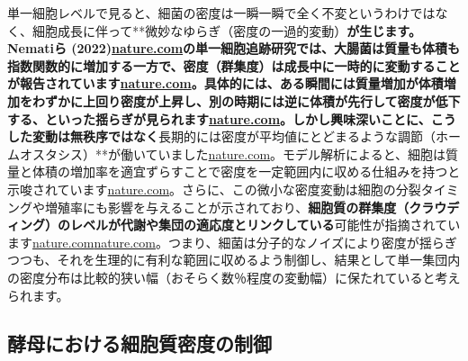 単一細胞レベルで見ると、細菌の密度は一瞬一瞬で全く不変というわけではなく、細胞成長に伴って**微妙なゆらぎ（密度の一過的変動）\textbf{が生じます。Nematiら (2022)\href{https://www.nature.com/articles/s42003-022-03348-2\#:~:text=Single,link\%20between\%20the\%20levels\%20of}{nature.com}の単一細胞追跡研究では、\textbf{大腸菌は質量も体積も指数関数的に増加する一方で、密度（群集度）は成長中に一時的に変動する}ことが報告されています\href{https://www.nature.com/articles/s42003-022-03348-2\#:~:text=Single,link\%20between\%20the\%20levels\%20of}{nature.com}。具体的には、ある瞬間には質量増加が体積増加をわずかに上回り密度が上昇し、別の時期には逆に体積が先行して密度が低下する、といった揺らぎが見られます\href{https://www.nature.com/articles/s42003-022-03348-2\#:~:text=Single,link\%20between\%20the\%20levels\%20of}{nature.com}。しかし興味深いことに、こうした変動は無秩序ではなく}長期的には密度が平均値にとどまるような調節（ホームオスタシス）**が働いていました\href{https://www.nature.com/articles/s42003-022-03348-2\#:~:text=fluctuate\%20during\%20growth,the\%20\%E2\%80\%9Cinvisible\%E2\%80\%9D\%20microfluidic\%20arrays\%20that}{nature.com}。モデル解析によると、細胞は質量と体積の増加率を適宜ずらすことで密度を一定範囲内に収める仕組みを持つと示唆されています\href{https://www.nature.com/articles/s42003-022-03348-2\#:~:text=fluctuate\%20during\%20growth,the\%20\%E2\%80\%9Cinvisible\%E2\%80\%9D\%20microfluidic\%20arrays\%20that}{nature.com}。さらに、この微小な密度変動は細胞の分裂タイミングや増殖率にも影響を与えることが示されており、\textbf{細胞質の群集度（クラウディング）のレベルが代謝や集団の適応度とリンクしている}可能性が指摘されています\href{https://www.nature.com/articles/s42003-022-03348-2\#:~:text=differentiation\%20yields\%20a\%20density\%20homeostasis,genetic\%20variability\%20into\%20consideration}{nature.com}\href{https://www.nature.com/articles/s42003-022-03348-2\#:~:text=differentiation\%20yields\%20a\%20density\%20homeostasis,the\%20\%E2\%80\%9Cinvisible\%E2\%80\%9D\%20microfluidic\%20arrays\%20that}{nature.com}。つまり、細菌は分子的なノイズにより密度が揺らぎつつも、それを生理的に有利な範囲に収めるよう制御し、結果として単一集団内の密度分布は比較的狭い幅（おそらく数％程度の変動幅）に保たれていると考えられます。

\subsection{酵母における細胞質密度の制御}


